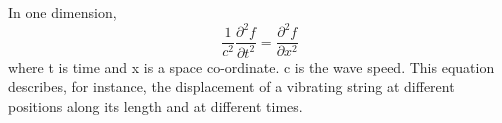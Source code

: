         In one dimension,
\[ \frac{1}{{c}^2} \frac{\partial ^2 {f}}{\partial {t}^2}
= \frac{\partial ^2 {f}}{\partial {x} ^2 } \]
where t is time and x is a space co-ordinate. c is the wave speed. This equation
describes, for instance, the displacement of a vibrating string at different
positions along its length and at different times.	